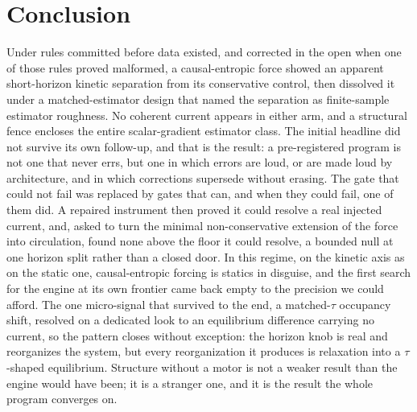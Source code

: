 \documentclass[11pt]{article}
\begin{document}
\section{Conclusion}
Under rules committed before data existed, and corrected in the open when one of those rules proved malformed, a causal-entropic force showed an apparent short-horizon kinetic separation from its conservative control, then dissolved it under a matched-estimator design that named the separation as finite-sample estimator roughness. No coherent current appears in either arm, and a structural fence encloses the entire scalar-gradient estimator class. The initial headline did not survive its own follow-up, and that is the result: a pre-registered program is not one that never errs, but one in which errors are loud, or are made loud by architecture, and in which corrections supersede without erasing. The gate that could not fail was replaced by gates that can, and when they could fail, one of them did. A repaired instrument then proved it could resolve a real injected current, and, asked to turn the minimal non-conservative extension of the force into circulation, found none above the floor it could resolve, a bounded null at one horizon split rather than a closed door. In this regime, on the kinetic axis as on the static one, causal-entropic forcing is statics in disguise, and the first search for the engine at its own frontier came back empty to the precision we could afford. The one micro-signal that survived to the end, a matched-$\tau$ occupancy shift, resolved on a dedicated look to an equilibrium difference carrying no current, so the pattern closes without exception: the horizon knob is real and reorganizes the system, but every reorganization it produces is relaxation into a $\tau$-shaped equilibrium. Structure without a motor is not a weaker result than the engine would have been; it is a stranger one, and it is the result the whole program converges on.
\end{document}
